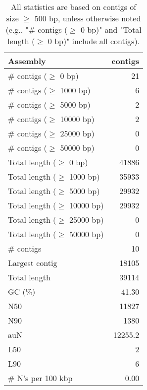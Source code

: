 \documentclass[12pt,a4paper]{article}
\begin{document}
\begin{table}[ht]
\begin{center}
\caption{All statistics are based on contigs of size $\geq$ 500 bp, unless otherwise noted (e.g., "\# contigs ($\geq$ 0 bp)" and "Total length ($\geq$ 0 bp)" include all contigs).}
\begin{tabular}{|l*{1}{|r}|}
\hline
Assembly & contigs \\ \hline
\# contigs ($\geq$ 0 bp) & 21 \\ \hline
\# contigs ($\geq$ 1000 bp) & 6 \\ \hline
\# contigs ($\geq$ 5000 bp) & 2 \\ \hline
\# contigs ($\geq$ 10000 bp) & 2 \\ \hline
\# contigs ($\geq$ 25000 bp) & 0 \\ \hline
\# contigs ($\geq$ 50000 bp) & 0 \\ \hline
Total length ($\geq$ 0 bp) & 41886 \\ \hline
Total length ($\geq$ 1000 bp) & 35933 \\ \hline
Total length ($\geq$ 5000 bp) & 29932 \\ \hline
Total length ($\geq$ 10000 bp) & 29932 \\ \hline
Total length ($\geq$ 25000 bp) & 0 \\ \hline
Total length ($\geq$ 50000 bp) & 0 \\ \hline
\# contigs & 10 \\ \hline
Largest contig & 18105 \\ \hline
Total length & 39114 \\ \hline
GC (\%) & 41.30 \\ \hline
N50 & 11827 \\ \hline
N90 & 1380 \\ \hline
auN & 12255.2 \\ \hline
L50 & 2 \\ \hline
L90 & 6 \\ \hline
\# N's per 100 kbp & 0.00 \\ \hline
\end{tabular}
\end{center}
\end{table}
\end{document}
